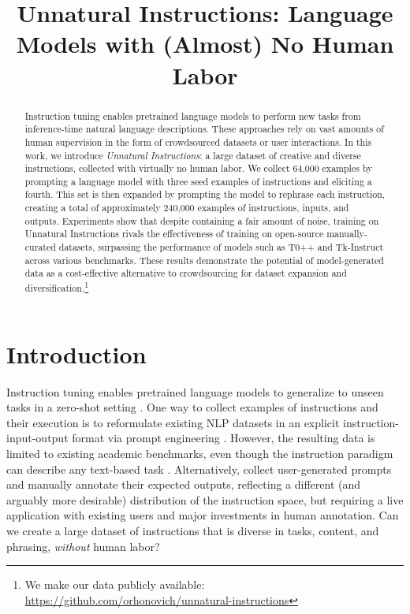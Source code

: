 \title{Unnatural Instructions: Language Models with (Almost) No Human Labor}

\begin{abstract}
Instruction tuning enables pretrained language models to perform new tasks from inference-time natural language descriptions. These approaches rely on vast amounts of human supervision in the form of crowdsourced datasets or user interactions. In this work, we introduce \emph{Unnatural Instructions}: a large dataset of creative and diverse instructions, collected with virtually no human labor. We collect 64,000 examples by prompting a language model with three seed examples of instructions and eliciting a fourth. This set is then expanded by prompting the model to rephrase each instruction, creating a total of approximately 240,000 examples of instructions, inputs, and outputs. Experiments show that despite containing a fair amount of noise, training on Unnatural Instructions rivals the effectiveness of training on open-source manually-curated datasets, surpassing the performance of models such as T0++ and Tk-Instruct across various benchmarks. These results demonstrate the potential of model-generated data as a cost-effective alternative to crowdsourcing for dataset expansion and diversification.\footnote{We make our data publicly available: \\\url{https://github.com/orhonovich/unnatural-instructions}}
\end{abstract}

\section{Introduction} 



Instruction tuning enables pretrained language models to generalize to unseen tasks in a zero-shot setting \cite{sanh2021multitask, wei2021finetuned}. One way to collect examples of instructions and their execution is to reformulate existing NLP datasets in an explicit instruction-input-output format via prompt engineering \cite{mishra-etal-2022-cross, supernaturalinstructions}. However, the resulting data is limited to existing academic benchmarks, even though the instruction paradigm can describe any text-based task \cite{turkingtest}. Alternatively, \citet{instructgpt} collect user-generated prompts and manually annotate their expected outputs, reflecting a different (and arguably more desirable) distribution of the instruction space, but requiring a live application with existing users and major investments in human annotation. Can we create a large dataset of instructions that is diverse in tasks, content, and phrasing, \textit{without} human labor?

